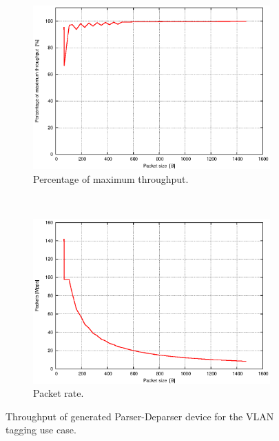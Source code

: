 \begin{figure}
    \centering
    \begin{subfigure}[b]{0.8\textwidth}
        \includegraphics[width=\textwidth]{chapters/pic/graphs/parser-deparser/full-vlan/throughput.eps}
        \caption{Percentage of maximum throughput.}
        \label{fig:bitThroughputVlan}
    \end{subfigure}
    ~
    \begin{subfigure}[b]{0.8\textwidth}
        \includegraphics[width=\textwidth]{chapters/pic/graphs/parser-deparser/full-vlan/mpps-throughput.eps}
        \caption{Packet rate.}
        \label{fig:packetThroughputVlan}
    \end{subfigure}
    
    \caption{Throughput of generated Parser-Deparser device for the VLAN tagging use case.}
    \label{fig:vlanThroughput}
\end{figure}

